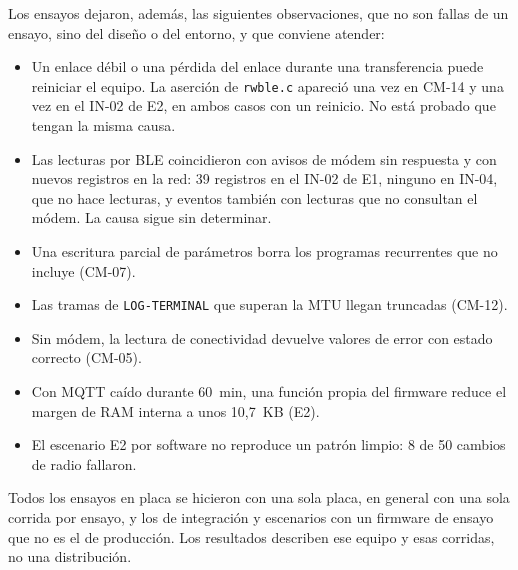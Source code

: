 Los ensayos dejaron, además, las siguientes observaciones, que no son fallas de un ensayo, sino del diseño o del entorno, y que conviene atender:

\begin{itemize}
\item Un enlace débil o una pérdida del enlace durante una transferencia puede reiniciar el equipo. La aserción de \texttt{rwble.c} apareció una vez en CM-14 y una vez en el IN-02 de E2, en ambos casos con un reinicio. No está probado que tengan la misma causa.
\item Las lecturas por BLE coincidieron con avisos de módem sin respuesta y con nuevos registros en la red: 39 registros en el IN-02 de E1, ninguno en IN-04, que no hace lecturas, y eventos también con lecturas que no consultan el módem. La causa sigue sin determinar.
\item Una escritura parcial de parámetros borra los programas recurrentes que no incluye (CM-07).
\item Las tramas de \texttt{LOG-TERMINAL} que superan la MTU llegan truncadas (CM-12).
\item Sin módem, la lectura de conectividad devuelve valores de error con estado correcto (CM-05).
\item Con MQTT caído durante 60~min, una función propia del firmware reduce el margen de RAM interna a unos 10,7~KB (E2).
\item El escenario E2 por software no reproduce un patrón limpio: 8 de 50 cambios de radio fallaron.
\end{itemize}

Todos los ensayos en placa se hicieron con una sola placa, en general con una sola corrida por ensayo, y los de integración y escenarios con un firmware de ensayo que no es el de producción. Los resultados describen ese equipo y esas corridas, no una distribución.
